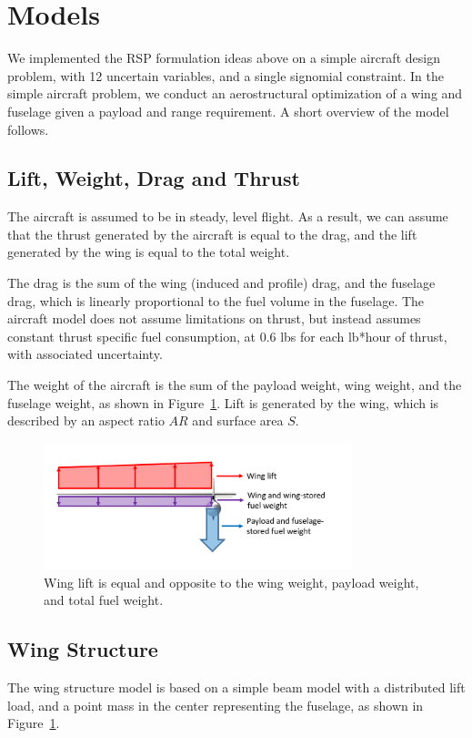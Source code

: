 \section{Models}

We implemented the RSP formulation ideas above on a simple aircraft design problem, with 12 uncertain variables, and a single signomial constraint. In the simple aircraft problem, we conduct an aerostructural optimization of a wing and fuselage given a payload and range requirement. A short overview of the model follows. 

\subsection{Lift, Weight, Drag and Thrust}

The aircraft is assumed to be in steady, level flight. As a result, we can assume that the thrust generated by the aircraft is equal to the drag, and the lift generated by the wing is equal to the total weight.

The drag is the sum of the wing (induced and profile) drag, and the fuselage drag, which is linearly proportional to the fuel volume in the fuselage. The aircraft model does not assume limitations on thrust, but instead assumes constant thrust specific fuel consumption, at 0.6 lbs for each lb*hour of thrust, with associated uncertainty. 

The weight of the aircraft is the sum of the payload weight, wing weight, and the fuselage weight, as shown in Figure~\ref{fig:liftweight}. Lift is generated by the wing, which is described by an aspect ratio $AR$ and surface area $S$. 

\begin{figure}
\centering
\caption{\label{fig:liftweight} Wing lift is equal and opposite to the wing weight, payload weight, and total fuel weight.}
\includegraphics[width=0.8\textwidth]{liftweight.PNG}
\end{figure}

\subsection{Wing Structure}
The wing structure model is based on a simple beam model with a distributed lift load, and a point mass in the center representing the fuselage, as shown in Figure~\ref{fig:liftweight}.

